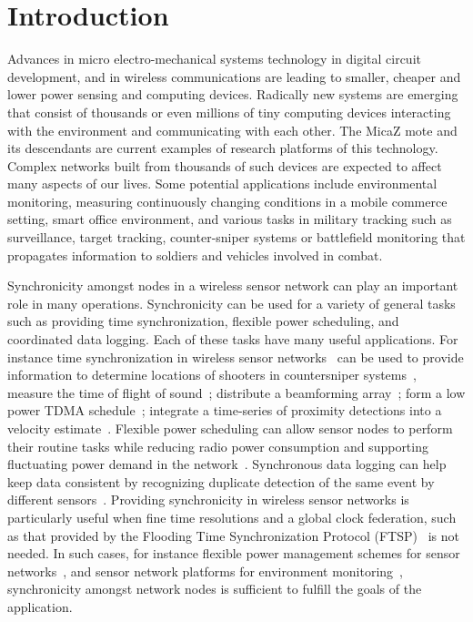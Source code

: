 \section{Introduction}
\label{sec:intro}

Advances in micro electro-mechanical systems technology in digital
circuit development, and in wireless communications are leading to smaller,
cheaper and lower power sensing and computing devices.  Radically new systems
are emerging that consist of thousands or even millions of tiny computing
devices interacting with the environment and communicating with each other.
The MicaZ mote and its descendants are current examples of research platforms
of this technology. Complex networks built from thousands of such devices are
expected to affect many aspects of our lives.  Some potential applications
include environmental monitoring, measuring continuously changing conditions
in a mobile commerce setting, smart office environment, and various tasks in
military tracking such as surveillance, target tracking, counter-sniper
systems or battlefield monitoring that propagates information to soldiers and
vehicles involved in combat.

Synchronicity amongst nodes in a wireless sensor network can play an important
role in many operations.  
Synchronicity can be used for a variety of general tasks such as providing time
synchronization, flexible power scheduling, and coordinated data logging.
Each of these tasks have many useful applications.  For instance time synchronization
in wireless sensor networks~\cite{rbs02,tpsn03,ftsp04}
can be used to provide information to determine locations of shooters in 
countersniper systems~\cite{sml04}, measure the time of flight of sound~\cite{ge01}; 
distribute a beamforming array~\cite{wym02}; form a low power TDMA schedule~\cite{ad98}; 
integrate a time-series of proximity detections into a velocity estimate~\cite{ce01}.
Flexible power scheduling can allow sensor nodes to perform their routine tasks while
reducing radio power consumption and supporting fluctuating power demand in the network~\cite{hdb04}.
Synchronous data logging can help keep data consistent by recognizing duplicate 
detection of the same event by different sensors~\cite{ige00}.
Providing synchronicity in wireless sensor networks is particularly useful
when fine time resolutions and a global clock federation, such as that provided
by the Flooding Time Synchronization Protocol (FTSP)~\cite{ftsp04} is not needed.
In such cases, for instance flexible power management schemes for sensor networks~\cite{hdb04},
and sensor network platforms for environment monitoring~\cite{sb03}, synchronicity
amongst network nodes is sufficient to fulfill the goals of the application.


